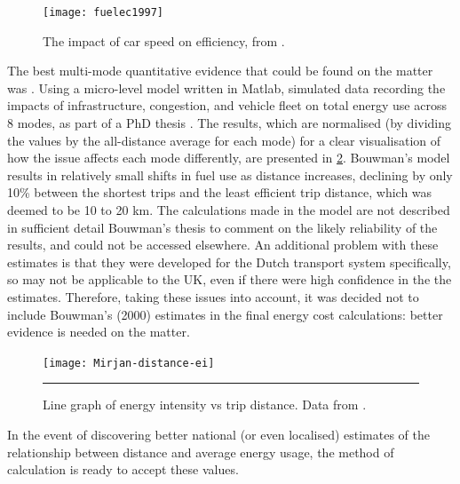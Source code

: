 \begin{figure}[h]
  \centerline{
    \texttt{[image: fuelec1997]}}
  \caption{The impact of car speed on efficiency, from
\citep{Anas2012-price-gas}.}
  \label{f:speeding-car}
\end{figure}

The best multi-mode quantitative evidence that could be found on the matter was
\citep{bouwman2000tracking}. Using a micro-level model written in
Matlab, simulated data recording the impacts of infrastructure, congestion,
and vehicle fleet on total energy use across 8 modes, as part of a PhD thesis
\citep{bouwman2000tracking}. The results, which are
normalised (by dividing the values by the all-distance average for each mode)
for a clear visualisation of how the issue affects each
mode differently, are presented in \cref{f:mirjan}. Bouwman's
\citeyear{bouwman2000tracking} model results in relatively small
shifts in fuel use as distance increases, declining by only 10\% between the
shortest trips and the least efficient trip distance, which was deemed to be 10
to 20 km. The calculations made in the model are not described in sufficient
detail Bouwman's thesis to comment on the likely reliability of the results, and
could not be accessed elsewhere. An additional problem with these estimates is
that they were developed for the Dutch transport system specifically, so may
not be applicable to the UK, even if there were high confidence in the
the estimates. Therefore, taking these issues into account, it was decided not
to include Bouwman's (2000) estimates in the final
energy cost calculations: better evidence is needed on the matter.

\begin{figure}[h]
  \centerline{
    \texttt{[image: Mirjan-distance-ei]}}
    \rule{35em}{0.5pt}
  \caption[Line graph of energy intensity vs trip distance]
  {Line graph of energy intensity vs trip distance. Data from
\citet{bouwman2000tracking}.}
  \label{f:mirjan}
\end{figure}

In the event of discovering better national (or even localised) estimates of
the relationship between distance and average energy usage, the method of
calculation is ready to accept these values.

